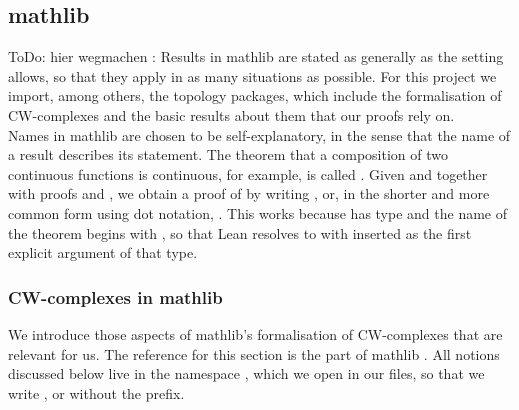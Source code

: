 \documentclass[11pt, a4paper, english]{article}
\theoremstyle{plain}
\theoremstyle{definition}
\theoremstyle{remark}
\numberwithin{equation}{section}
\numberwithin{theorem}{section}
\begin{document}
\subsection{mathlib} \label{subsec:mathlib}
ToDo: hier wegmachen : \cite{mathlibPaper}
Results in mathlib are stated as generally as the setting allows, so that they apply in as many situations as possible. For this project we import, among others, the topology packages, which include the formalisation of CW-complexes and the basic results about them that our proofs rely on. \\
Names in mathlib are chosen to be self-explanatory, in the sense that the name of a result describes its statement. The theorem that a composition of two continuous functions is continuous, for example, is called . Given  and  together with proofs  and , we obtain a proof of  by writing , or, in the shorter and more common form using dot notation, . This works because  has type  and the name of the theorem begins with , so that Lean resolves  to  with  inserted as the first explicit argument of that type.\\

\subsubsection{CW-complexes in mathlib} \label{subsubsec:mathlibCW}
We introduce those aspects of mathlib's formalisation of CW-complexes that are relevant for us. The reference for this section is the part  of mathlib \cite{mathlib}. All notions discussed below live in the namespace , which we open in our files, so that we write ,  or  without the prefix.\\ 
\end{document}
